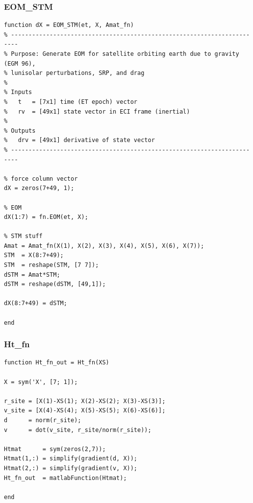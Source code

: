 \documentclass[conf]{new-aiaa}
\begin{document}
\subsubsection{EOM\_STM}
\begin{lstlisting}
function dX = EOM_STM(et, X, Amat_fn)
% ------------------------------------------------------------------------
% Purpose: Generate EOM for satellite orbiting earth due to gravity (EGM 96),
% lunisolar perturbations, SRP, and drag 
% 
% Inputs 
%   t   = [7x1] time (ET epoch) vector 
%   rv  = [49x1] state vector in ECI frame (inertial) 
% 
% Outputs 
%   drv = [49x1] derivative of state vector 
% ------------------------------------------------------------------------

% force column vector 
dX = zeros(7+49, 1);   

% EOM 
dX(1:7) = fn.EOM(et, X); 

% STM stuff 
Amat = Amat_fn(X(1), X(2), X(3), X(4), X(5), X(6), X(7)); 
STM  = X(8:7+49); 
STM  = reshape(STM, [7 7]); 
dSTM = Amat*STM; 
dSTM = reshape(dSTM, [49,1]); 

dX(8:7+49) = dSTM; 

end 
\end{lstlisting}

\subsubsection{Ht\_fn}
\begin{lstlisting}
function Ht_fn_out = Ht_fn(XS)

X = sym('X', [7; 1]); 

r_site = [X(1)-XS(1); X(2)-XS(2); X(3)-XS(3)]; 
v_site = [X(4)-XS(4); X(5)-XS(5); X(6)-XS(6)]; 
d      = norm(r_site); 
v      = dot(v_site, r_site/norm(r_site)); 

Htmat      = sym(zeros(2,7)); 
Htmat(1,:) = simplify(gradient(d, X)); 
Htmat(2,:) = simplify(gradient(v, X)); 
Ht_fn_out  = matlabFunction(Htmat); 

end 
\end{lstlisting}
\end{document}
